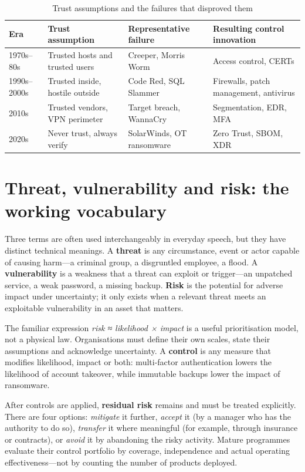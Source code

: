 \documentclass[11pt,openany]{book}
\begin{document}
\begin{table}[htbp]
  \centering\small
  \caption{Trust assumptions and the failures that disproved them}
  \begin{tabularx}{\linewidth}{>{\raggedright\arraybackslash}X >{\raggedright\arraybackslash}X >{\raggedright\arraybackslash}X >{\raggedright\arraybackslash}X}
    \toprule
    \textbf{Era} & \textbf{Trust assumption} & \textbf{Representative failure} & \textbf{Resulting control innovation} \\
    \midrule
    1970s–80s & Trusted hosts and trusted users & Creeper, Morris Worm & Access control, CERTs \\
    1990s–2000s & Trusted inside, hostile outside & Code Red, SQL Slammer & Firewalls, patch management, antivirus \\
    2010s & Trusted vendors, VPN perimeter & Target breach, WannaCry & Segmentation, EDR, MFA \\
    2020s & Never trust, always verify & SolarWinds, OT ransomware & Zero Trust, SBOM, XDR \\
    \bottomrule
  \end{tabularx}
\end{table}
\section{Threat, vulnerability and risk: the working vocabulary}\label{sec:1.5}
Three terms are often used interchangeably in everyday speech, but they have distinct technical meanings. A \textbf{threat} is any circumstance, event or actor capable of causing harm—a criminal group, a disgruntled employee, a flood. A \textbf{vulnerability} is a weakness that a threat can exploit or trigger—an unpatched service, a weak password, a missing backup. \textbf{Risk} is the potential for adverse impact under uncertainty; it only exists when a relevant threat meets an exploitable vulnerability in an asset that matters.

The familiar expression \emph{risk ≈ likelihood × impact} is a useful prioritisation model, not a physical law. Organisations must define their own scales, state their assumptions and acknowledge uncertainty. A \textbf{control} is any measure that modifies likelihood, impact or both: multi-factor authentication lowers the likelihood of account takeover, while immutable backups lower the impact of ransomware.

After controls are applied, \textbf{residual risk} remains and must be treated explicitly. There are four options: \emph{mitigate} it further, \emph{accept} it (by a manager who has the authority to do so), \emph{transfer} it where meaningful (for example, through insurance or contracts), or \emph{avoid} it by abandoning the risky activity. Mature programmes evaluate their control portfolio by coverage, independence and actual operating effectiveness—not by counting the number of products deployed.
\end{document}

